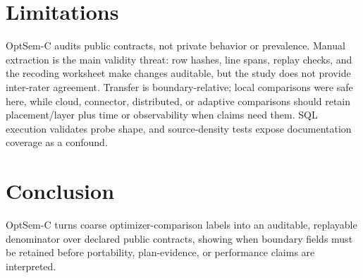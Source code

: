 
\FloatBarrier

\section{Limitations}
\label{sec:limitations}
OptSem-C audits public contracts, not private behavior or prevalence.  Manual extraction is the main validity threat: row hashes, line spans, replay checks, and the recoding worksheet make changes auditable, but the study does not provide inter-rater agreement.  Transfer is boundary-relative; local comparisons were safe here, while cloud, connector, distributed, or adaptive comparisons should retain placement/layer plus time or observability when claims need them.  SQL execution validates probe shape, and source-density tests expose documentation coverage as a confound.

\section{Conclusion}
\label{sec:conclusion}
OptSem-C turns coarse optimizer-comparison labels into an auditable, replayable denominator over declared public contracts, showing when boundary fields must be retained before portability, plan-evidence, or performance claims are interpreted.
\FloatBarrier

